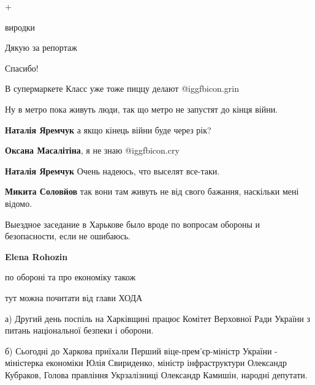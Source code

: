  
 
 
 
 
\zzSecCmt

\begin{itemize} %
+

виродки

Дякую за репортаж

Спасибо!

В супермаркете Класс уже тоже пиццу делают  @igg{fbicon.grin} 

Ну в метро пока живуть люди, так що метро не запустят до кінця війни.

\begin{itemize} %
\textbf{Наталія Яремчук} а якщо кінець війни буде через рік?

\textbf{Оксана Масалітіна}, я не знаю  @igg{fbicon.cry} 

\textbf{Наталія Яремчук} Очень надеюсь, что выселят все-таки.

\textbf{Микита Соловйов} так вони там живуть не від свого бажання, наскільки мені відомо.
\end{itemize} %


Выездное заседание в Харькове было вроде по вопросам обороны и безопасности,
если не ошибаюсь.

\begin{itemize} %
\textbf{Elena Rohozin} 

по обороні та про економіку також

тут можна почитати від глави ХОДА

а) Другий день поспіль на Харківщині працює Комітет Верховної Ради України з
питань національної безпеки і оборони.

б) Сьогодні до Харкова приїхали Перший віце-прем'єр-міністр України -
міністерка економіки Юлія Свириденко, міністр інфраструктури Олександр
Кубраков, Голова правління Укрзалізниці Олександр Камишін, народні депутати.


\end{itemize}
\end{itemize}
